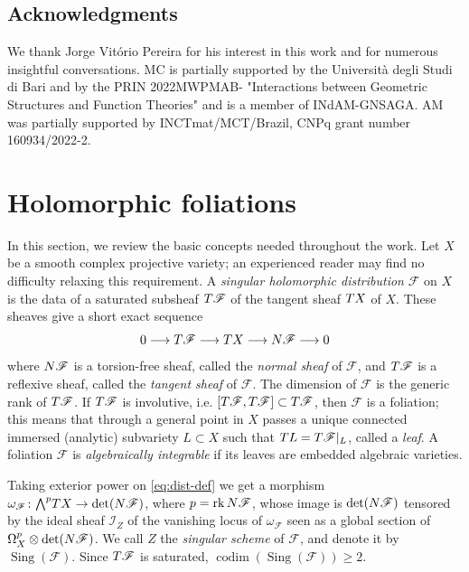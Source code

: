 \documentclass[twoside]{amsart}
\numberwithin{equation}{section}
\newcommand{\sI}{\mathscr{I}}
\DeclareMathOperator{\sing}{Sing}
\DeclareMathOperator{\rk}{rk}
\DeclareMathOperator{\codim}{codim}
\newcommand{\sF}{\mathscr{F}}
\newcommand{\tF}{{\rm T}\sF}
\newcommand{\nF}{{\rm N}\sF}
\newcommand{\tX}{{\rm T}X}
\newcommand{\lra}{ \longrightarrow }
\newcommand{\extp}{{\textstyle \bigwedge}}
\theoremstyle{definition}
\begin{document}
\subsection*{Acknowledgments}
We thank Jorge Vit\'orio Pereira for his interest in this work and for numerous insightful conversations. MC is partially supported by the Universit\`a degli Studi di Bari and by the PRIN 2022MWPMAB- "Interactions between Geometric Structures and Function Theories" and is a member of INdAM-GNSAGA. AM was partially supported by INCTmat/MCT/Brazil, CNPq grant number 160934/2022-2. 

 
 
 
 

 

 
 
\section{Holomorphic foliations}\label{sectionfol}
In this section, we review the basic concepts needed throughout the work. Let $X$ be a smooth complex projective variety;  an experienced reader may find no difficulty relaxing this requirement. A \emph{singular holomorphic distribution} $\sF$ on $X$ is the data of a saturated subsheaf $\tF$ of the {tangent sheaf} $\tX$ of $X$. These sheaves give a short exact sequence
\begin{equation}\label{eq:dist-def}
    0  \lra  \tF  \lra  \tX  \lra  \nF  \lra  0
\end{equation}
where $\nF$ is a torsion-free sheaf, called the \emph{normal sheaf} of $\sF$, and $\tF$ is a reflexive sheaf, called the \emph{tangent sheaf} of $\sF$. The dimension of $\sF$ is the generic rank of $\tF$. If $\tF$ is involutive, i.e. $[\tF, \tF] \subset \tF$, then $\sF$ is a foliation; this means that through a general point in $X$ passes a unique connected immersed (analytic) subvariety $L \subset X$ such that ${\rm T}L = \tF|_L$, called a \emph{leaf}. A foliation $\sF$ is \emph{algebraically integrable} if its leaves are embedded algebraic varieties. 

Taking exterior power on \eqref{eq:dist-def} we get a morphism $\omega_{\sF}\colon \extp^p\tX \to \det(\nF)$, where $p = \rk \nF$, whose image is $\det(\nF)$ tensored by the ideal sheaf $\sI_Z$ of the vanishing locus of $\omega_{\sF}$ seen as a global section of $\Omega_X^p\otimes \det(\nF)$. We call $Z$ the \emph{singular scheme} of $\sF$, and denote it by $\sing(\sF)$. Since $\tF$ is saturated, $\codim(\sing(\sF))\geq 2$.
\end{document}
